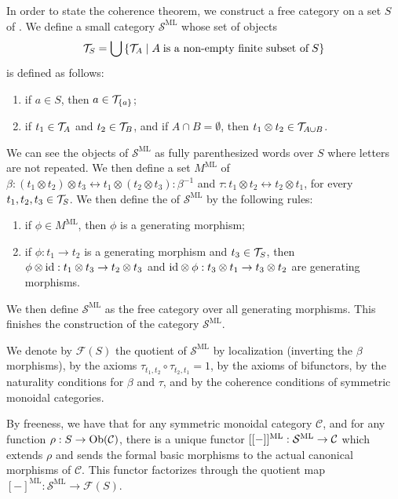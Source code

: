 In order to state the coherence theorem, we construct a free category on a set $S$ of . 
We define a small category $\mathcal{S}^{\mathrm{ML}}$ whose set of objects $${\cal T}_S=\bigcup\left\{{\cal T}_A \mid A \;\mbox{is a non-empty finite subset of}\;S\right\}$$ is defined as follows:
\begin{enumerate}
    \item if $a \in S$, then $a\in{\cal T}_{\left\{a\right\}}$;
    \item if $t_1 \in {\cal T}_A$ and $t_2 \in {\cal T}_B$, and if $A\cap B=\emptyset$,  then $t_1 \otimes t_2\in{\cal T}_{A\cup B}$.
\end{enumerate}
We can see the objects of $\mathcal{S}^{\mathrm{ML}}$ as fully parenthesized words over $S$ where letters are not repeated.
We then define a set $M^{\mathrm{ML}}$ of  $\beta: (t_1 \otimes t_2) \otimes t_3 \leftrightarrow t_1 \otimes (t_2\otimes t_3) : \beta^{-1}$  and $\tau: t_1\otimes t_2 \leftrightarrow t_2 \otimes t_1$,  for every $t_1,t_2,t_3  \in {\cal T}_S$.
We then define the  of $\mathcal{S}^{\mathrm{ML}}$ by the following rules:
\begin{enumerate}
    \item if $\phi \in M^{\mathrm{ML}}$, then $\phi$ is a generating morphism; 
    \item if $\phi : t_1 \to t_2$ is a generating morphism and $t_3 \in {\cal T}_S$, then $\phi \otimes \mathrm{id} : t_1 \otimes t_3 \to t_2 \otimes t_3$ and $\mathrm{id} \otimes \phi : t_3 \otimes t_1 \to t_3 \otimes t_2$ are generating morphisms.
\end{enumerate}
We then define $\mathcal{S}^{\mathrm{ML}}$ as the free category over all generating morphisms. 
This finishes the construction of the category $\mathcal{S}^{\mathrm{ML}}$.
\begin{definition}
    We denote by $\mathcal{F}(S)$ the quotient of $\mathcal{S}^{\mathrm{ML}}$ by localization (inverting the $\beta$ morphisms), by the axioms $\tau_{t_1,t_2}\circ \tau_{t_2,t_1}=1$, by the axioms of bifunctors, by the naturality conditions for $\beta$ and $\tau$, and by the coherence conditions of symmetric monoidal categories.
\end{definition}
By freeness, we have that for any symmetric monoidal category $\mathcal{C}$, and for any function $\rho : S \to \mathrm{Ob}(\mathcal{C})$, there is a unique functor  $[[-]]^{\mathrm{ML}}:\mathcal{S}^{\mathrm{ML}} \to \mathcal{C}$ which extends $\rho$ and sends the formal basic morphisms to the actual canonical morphisms of $\mathcal{C}$.
This functor factorizes  through the quotient map $[-]^{\mathrm{ML}} :\mathcal{S}^{\mathrm{ML}} \to \mathcal{F}(S)$.

